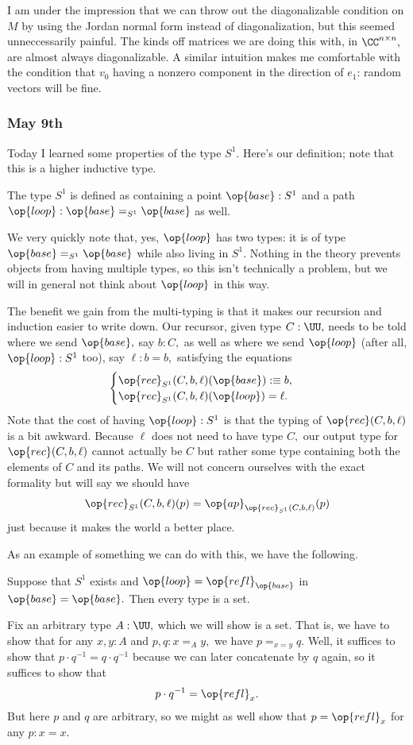 I am under the impression that we can throw out the diagonalizable condition on $M$ by using the Jordan normal form instead of diagonalization, but this seemed unneccessarily painful. The kinds off matrices we are doing this with, in $\CC^{n\times n},$ are almost always diagonalizable. A similar intuition makes me comfortable with the condition that $v_0$ having a nonzero component in the direction of $e_1$: random vectors will be fine.

\subsubsection{May 9th}
Today I learned some properties of the type $S^1.$ Here's our definition; note that this is a higher inductive type.
\begin{definition}
    The type $S^1$ is defined as containing a point $\op{base}:S^1$ and a path $\op{loop}:\op{base}=_{S^1}\op{base}$ as well.
\end{definition}
We very quickly note that, yes, $\op{loop}$ has two types: it is of type $\op{base}=_{S^1}\op{base}$ while also living in $S^1.$ Nothing in the theory prevents objects from having multiple types, so this isn't technically a problem, but we will in general not think about $\op{loop}$ in this way.

The benefit we gain from the multi-typing is that it makes our recursion and induction easier to write down. Our recursor, given type $C:\UU,$ needs to be told where we send $\op{base},$ say $b:C,$ as well as where we send $\op{loop}$ (after all, $\op{loop}:S^1$ too), say $\ell:b=b,$ satisfying the equations
\[\begin{cases}
    \op{rec}_{S^1}(C,b,\ell)(\op{base}):\equiv b, \\
    \op{rec}_{S^1}(C,b,\ell)(\op{loop})=\ell.
\end{cases}\]
Note that the cost of having $\op{loop}:S^1$ is that the typing of $\op{rec}(C,b,\ell)$ is a bit awkward. Because $\ell$ does not need to have type $C,$ our output type for $\op{rec}(C,b,\ell)$ cannot actually be $C$ but rather some type containing both the elements of $C$ and its paths. We will not concern ourselves with the exact formality but will say we should have
\[\op{rec}_{S^1}(C,b,\ell)(p)=\op{ap}_{\op{rec}_{S^1}(C,b,\ell)}(p)\]
just because it makes the world a better place.

As an example of something we can do with this, we have the following.
\begin{proposition}
    Suppose that $S^1$ exists and $\op{loop}=\op{refl}_{\op{base}}$ in $\op{base}=\op{base}.$ Then every type is a set.
\end{proposition}
Fix an arbitrary type $A:\UU,$ which we will show is a set. That is, we have to show that for any $x,y:A$ and $p,q:x=_Ay,$ we have $p=_{x=y}q.$ Well, it suffices to show that $p\cdot q^{-1}=q\cdot q^{-1}$ because we can later concatenate by $q$ again, so it suffices to show that
\[p\cdot q^{-1}=\op{refl}_x.\]
But here $p$ and $q$ are arbitrary, so we might as well show that $p=\op{refl}_x$ for any $p:x=x.$

